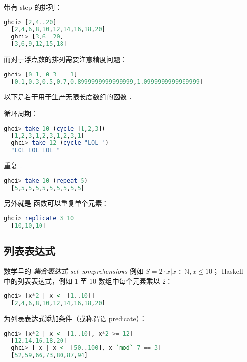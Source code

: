 \documentclass[./main.tex]{subfiles}
\begin{document}
带有 step 的排列：

\begin{lstlisting}[language=Haskell]
  ghci> [2,4..20]
  [2,4,6,8,10,12,14,16,18,20]
  ghci> [3,6..20]
  [3,6,9,12,15,18]
\end{lstlisting}

而对于浮点数的排列需要注意精度问题：

\begin{lstlisting}[language=Haskell]
  ghci> [0.1, 0.3 .. 1]
  [0.1,0.3,0.5,0.7,0.8999999999999999,1.0999999999999999]
\end{lstlisting}

以下是若干用于生产无限长度数组的函数：

 循环周期：

\begin{lstlisting}[language=Haskell]
  ghci> take 10 (cycle [1,2,3])
  [1,2,3,1,2,3,1,2,3,1]
  ghci> take 12 (cycle "LOL ")
  "LOL LOL LOL "
\end{lstlisting}

 重复：

\begin{lstlisting}[language=Haskell]
  ghci> take 10 (repeat 5)
  [5,5,5,5,5,5,5,5,5,5]
\end{lstlisting}

另外就是  函数可以重复单个元素：

\begin{lstlisting}[language=Haskell]
  ghci> replicate 3 10
  [10,10,10]
\end{lstlisting}

\subsection*{列表表达式}

数学里的 \textit{集合表达式 set comprehensions} 例如 $S = { 2 \cdot x | x \in \mathbb{N}, x \le 10 }$；
Haskell 中的列表表达式，例如 1 至 10 数组中每个元素乘以 2：

\begin{lstlisting}[language=Haskell]
  ghci> [x*2 | x <- [1..10]]
  [2,4,6,8,10,12,14,16,18,20]
\end{lstlisting}

为列表表达式添加条件（或称谓语 predicate）：

\begin{lstlisting}[language=Haskell]
  ghci> [x*2 | x <- [1..10], x*2 >= 12]
  [12,14,16,18,20]
  ghci> [ x | x <- [50..100], x `mod` 7 == 3]
  [52,59,66,73,80,87,94]
\end{lstlisting}
\end{document}
